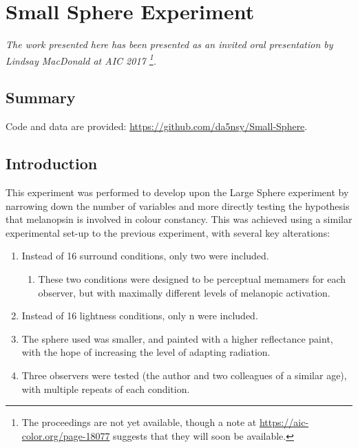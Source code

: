 \chapter{Small Sphere Experiment}
\label{chap:SmallSphere}

\textit{The work presented here has been presented as an invited oral presentation by Lindsay MacDonald at AIC 2017 \citep{macdonald_melanopsin_2017}\footnote{The proceedings are not yet available, though a note at \url{https://aic-color.org/page-18077} suggests that they will soon be available.}.}


\section{Summary}

Code and data are provided: \url{https://github.com/da5nsy/Small-Sphere}.

\section{Introduction}


This experiment was performed to develop upon the Large Sphere experiment by narrowing down the number of variables and more directly testing the hypothesis that melanopsin is involved in colour constancy. This was achieved using a similar experimental set-up to the previous experiment, with several key alterations:

\begin{enumerate}
    \item Instead of 16 surround conditions, only two were included.
    \begin{enumerate}
        \item These two conditions were designed to be perceptual memamers for each observer, but with maximally different levels of melanopic activation.
    \end{enumerate}
    \item Instead of 16 lightness conditions, only n %
    were included.
    \item The sphere used was smaller, and painted with a higher reflectance paint, with the hope of increasing the level of adapting radiation.
    \item Three observers were tested (the author and two colleagues of a similar age), with multiple repeats of each condition.
\end{enumerate}

